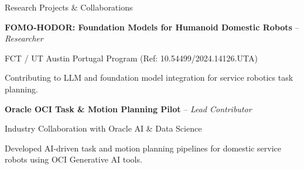 \begin{rubric}{Research Projects \& Collaborations}

\entry*[2025 -- 2026]
	\textbf{FOMO-HODOR: Foundation Models for Humanoid Domestic Robots } -- \textit{ Researcher } \par
\small FCT / UT Austin Portugal Program (Ref: 10.54499/2024.14126.UTA)	\par
	\small Contributing to LLM and foundation model integration for service robotics task planning.

\entry*[2025]
	\textbf{Oracle OCI Task \& Motion Planning Pilot } -- \textit{ Lead Contributor } \par
\small Industry Collaboration with Oracle AI \& Data Science	\par
	\small Developed AI-driven task and motion planning pipelines for domestic service robots using OCI Generative AI tools.

\end{rubric}